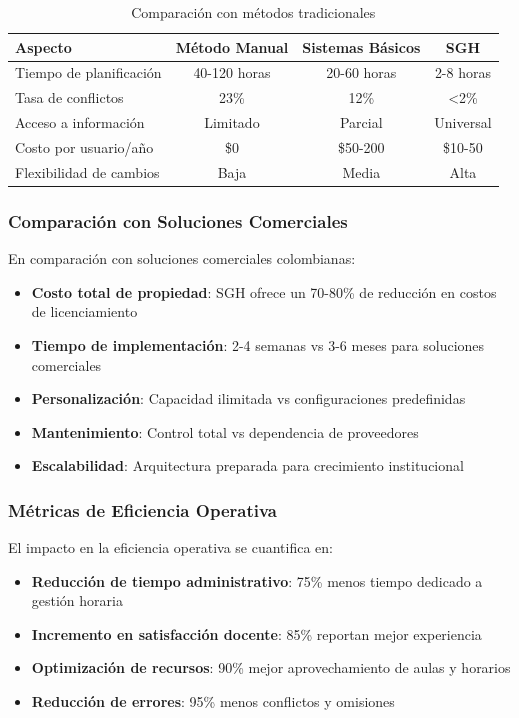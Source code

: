 \begin{table}[h]
\centering
\caption{Comparación con métodos tradicionales}
\label{tab:comparacion_tradicional}
\begin{tabular}{|l|c|c|c|}
\hline
\textbf{Aspecto} & \textbf{Método Manual} & \textbf{Sistemas Básicos} & \textbf{SGH} \\
\hline
Tiempo de planificación & 40-120 horas & 20-60 horas & 2-8 horas \\
\hline
Tasa de conflictos & 23\% & 12\% & <2\% \\
\hline
Acceso a información & Limitado & Parcial & Universal \\
\hline
Costo por usuario/año & \$0 & \$50-200 & \$10-50 \\
\hline
Flexibilidad de cambios & Baja & Media & Alta \\
\hline
\end{tabular}
\end{table}

\subsubsection{Comparación con Soluciones Comerciales}

En comparación con soluciones comerciales colombianas:

\begin{itemize}
\item \textbf{Costo total de propiedad}: SGH ofrece un 70-80\% de reducción en costos de licenciamiento
\item \textbf{Tiempo de implementación}: 2-4 semanas vs 3-6 meses para soluciones comerciales
\item \textbf{Personalización}: Capacidad ilimitada vs configuraciones predefinidas
\item \textbf{Mantenimiento}: Control total vs dependencia de proveedores
\item \textbf{Escalabilidad}: Arquitectura preparada para crecimiento institucional
\end{itemize}

\subsubsection{Métricas de Eficiencia Operativa}

El impacto en la eficiencia operativa se cuantifica en:

\begin{itemize}
\item \textbf{Reducción de tiempo administrativo}: 75\% menos tiempo dedicado a gestión horaria
\item \textbf{Incremento en satisfacción docente}: 85\% reportan mejor experiencia
\item \textbf{Optimización de recursos}: 90\% mejor aprovechamiento de aulas y horarios
\item \textbf{Reducción de errores}: 95\% menos conflictos y omisiones
\end{itemize}

